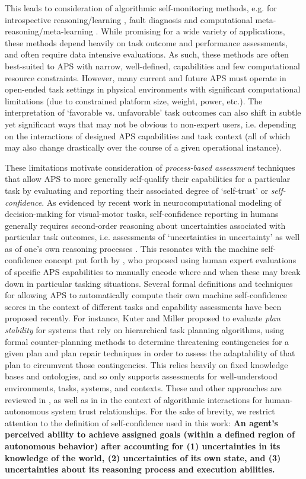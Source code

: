 This leads to consideration of algorithmic self-monitoring methods, e.g. for introspective reasoning/learning \cite{Huang2017-lk}, fault diagnosis and computational meta-reasoning/meta-learning \cite{grant2018recasting}. 
While promising for a wide variety of applications, these methods depend heavily on task outcome and performance assessments, and often require data intensive evaluations. 
As such, these methods are often best-suited to APS with narrow, well-defined, capabilities and few computational resource constraints. 
However, many current and future APS must operate in open-ended task settings in physical environments with significant computational limitations (due to constrained platform size, weight, power, etc.). 
The interpretation of `favorable vs. unfavorable' task outcomes can also shift in subtle yet significant ways that may not be obvious to non-expert users, i.e. depending on the interactions of designed APS capabilities and task context (all of which may also change drastically over the course of a given operational instance). 

These limitations motivate consideration of \emph{process-based assessment} techniques that allow APS to more generally self-qualify their capabilities for a particular task by evaluating and reporting their associated degree of `self-trust' or \emph{self-confidence}. 
As evidenced by recent work in neurocomputational modeling of decision-making for visual-motor tasks,
self-confidence reporting in humans generally requires second-order reasoning about uncertainties associated with particular task outcomes, i.e. assessments of `uncertainties in uncertainty' as well as of one's own reasoning processes \cite{Adler2016-oi}.  This resonates with the machine self-confidence concept put forth by \cite{Hutchins2015-if}, who proposed using human expert evaluations of specific APS capabilities to manually encode where and when these may break down in particular tasking situations. 
Several formal definitions and techniques for allowing APS to automatically compute their own machine self-confidence scores in the context of different tasks and capability assessments have been proposed recently.
For instance, Kuter and Miller \cite{Kuter2015-qh} proposed to evaluate \emph{plan stability} for systems that rely on hierarchical task planning algorithms, using formal counter-planning methods to determine threatening contingencies for a given plan and plan repair techniques in order to assess the adaptability of that plan to circumvent those contingencies. 
This relies heavily on fixed knowledge bases and ontologies, and so only supports assessments for well-understood environments, tasks, systems, and contexts. 
These and other approaches are reviewed in \cite{Sweet2016-tz}, as well as in \cite{Israelsen2017-ym} in the context of algorithmic interactions for human-autonomous system trust relationships. 
For the sake of brevity, we restrict attention to the definition of self-confidence used in this work: \textbf{An agent's perceived ability to achieve assigned goals (within a defined region of autonomous behavior) after accounting for (1) uncertainties in its knowledge of the world, (2) uncertainties of its own state, and (3) uncertainties about its reasoning process and execution abilities.}

